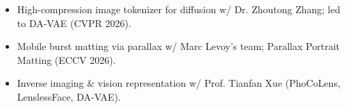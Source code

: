 \documentclass{resume}
\begin{document}
\begin{itemize}
\item High-compression image tokenizer for diffusion w/ Dr. Zhoutong Zhang; led to DA-VAE (CVPR 2026).
\end{itemize}

\begin{itemize}
\item Mobile burst matting via parallax w/ Marc Levoy's team; Parallax Portrait Matting (ECCV 2026).
\end{itemize}

\begin{itemize}
\item Inverse imaging \& vision representation w/ Prof. Tianfan Xue (PhoCoLens, LenslessFace, DA-VAE).
\end{itemize}
\end{document}
